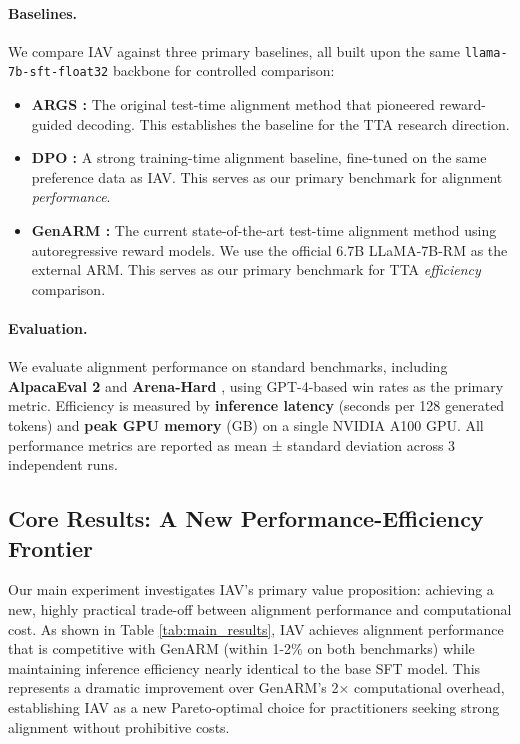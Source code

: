\documentclass{article}
\begin{document}
\paragraph{Baselines.}
We compare IAV against three primary baselines, all built upon the same \texttt{llama-7b-sft-float32} backbone for controlled comparison:
\begin{itemize}
    \item \textbf{ARGS \citep{args2024}:} The original test-time alignment method that pioneered reward-guided decoding. This establishes the baseline for the TTA research direction.
    \item \textbf{DPO \citep{dpo2023}:} A strong training-time alignment baseline, fine-tuned on the same preference data as IAV. This serves as our primary benchmark for alignment \textit{performance}.
    \item \textbf{GenARM \citep{genarm2025}:} The current state-of-the-art test-time alignment method using autoregressive reward models. We use the official 6.7B LLaMA-7B-RM as the external ARM. This serves as our primary benchmark for TTA \textit{efficiency} comparison.
\end{itemize}

\paragraph{Evaluation.}
We evaluate alignment performance on standard benchmarks, including \textbf{AlpacaEval 2} \citep{alpacaeval2023} and \textbf{Arena-Hard} \citep{arena-hard2024}, using GPT-4-based win rates as the primary metric. Efficiency is measured by \textbf{inference latency} (seconds per 128 generated tokens) and \textbf{peak GPU memory} (GB) on a single NVIDIA A100 GPU. All performance metrics are reported as mean ± standard deviation across 3 independent runs.

\subsection{Core Results: A New Performance-Efficiency Frontier}
Our main experiment investigates IAV's primary value proposition: achieving a new, highly practical trade-off between alignment performance and computational cost. As shown in Table \ref{tab:main_results}, IAV achieves alignment performance that is competitive with GenARM (within 1-2\% on both benchmarks) while maintaining inference efficiency nearly identical to the base SFT model. This represents a dramatic improvement over GenARM's 2× computational overhead, establishing IAV as a new Pareto-optimal choice for practitioners seeking strong alignment without prohibitive costs.
\end{document}
